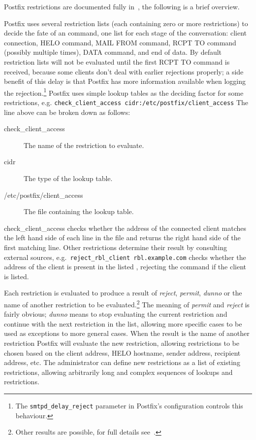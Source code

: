 \documentclass[a4paper,12pt,draft]{article}
\newcommand{\tab}[0]{%
    \hspace*{2em}%
}
\begin{document}
Postfix restrictions are documented fully in~\cite{smtpd_access_readme,
smtpd_per_user_control, policy-servers}, the following is a brief overview.

Postfix uses several restriction lists (each containing zero or more
restrictions) to decide the fate of an \SMTP{} command, one list for each
stage of the \SMTP{} conversation: client connection, HELO command, MAIL
FROM command, RCPT TO command (possibly multiple times), DATA command, and
end of data.  By default restriction lists will not be evaluated until the
first RCPT TO command is received, because some clients don't deal with
earlier rejections properly; a side benefit of this delay is that Postfix
has more information available when logging the rejection.\footnote{The
\texttt{smtpd\_delay\_reject} parameter in Postfix's configuration controls
this behaviour.}  Postfix uses simple lookup tables as the deciding factor
for some restrictions, e.g.\newline
\tab{}\texttt{check\_client\_access~cidr:/etc/postfix/client\_access}
\newline The line above can be broken down as follows:

\begin{description}

    \item [check\_client\_access] The name of the restriction to evaluate.

    \item [cidr] The type of the lookup table.

    \item [/etc/postfix/client\_access] The file containing the lookup
        table.

\end{description}

check\_client\_access checks whether the \IP{} address of the connected
client matches the left hand side of each line in the file and returns the
right hand side of the first matching line.  Other restrictions determine
their result by consulting external sources, e.g.\
\texttt{reject\_rbl\_client rbl.example.com} checks whether the \IP{}
address of the client is present in the listed \RBL{}, rejecting the
command if the client is listed.

Each restriction is evaluated to produce a result of \textit{reject},
\textit{permit}, \textit{dunno\/} or the name of another restriction to be
evaluated.\footnote{Other results are possible, for full details
see~\cite{smtpd_access_readme, smtpd_per_user_control, policy-servers}.}
The meaning of \textit{permit\/} and \textit{reject\/} is fairly obvious;
\textit{dunno\/} means to stop evaluating the current restriction and
continue with the next restriction in the list, allowing more specific
cases to be used as exceptions to more general cases.  When the result is
the name of another restriction Postfix will evaluate the new restriction,
allowing restrictions to be chosen based on the client \IP{} address, HELO
hostname, sender address, recipient address, etc.  The administrator can
define new restrictions as a list of existing restrictions, allowing
arbitrarily long and complex sequences of lookups and restrictions.
\end{document}
